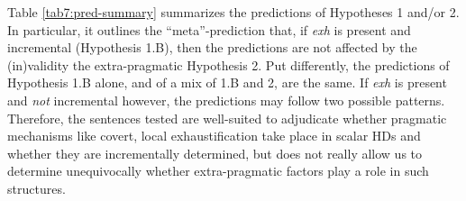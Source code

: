 Table \ref{tab7:pred-summary} summarizes the predictions of Hypotheses 1 and/or 2. In particular, it outlines the ``meta''-prediction that, if \textit{exh} is present and incremental (Hypothesis 1.B), then the predictions are not affected by the (in)validity the extra-pragmatic Hypothesis 2. Put differently, the predictions of Hypothesis 1.B alone, and of a mix of 1.B and 2, are the same. If \textit{exh} is present and \textit{not} incremental however, the predictions may follow two possible patterns. Therefore, the sentences tested are well-suited to adjudicate whether pragmatic mechanisms like covert, local exhaustification take place in scalar HDs and whether they are incrementally determined, but does not really allow us to determine unequivocally whether extra-pragmatic factors play a role in such structures.

